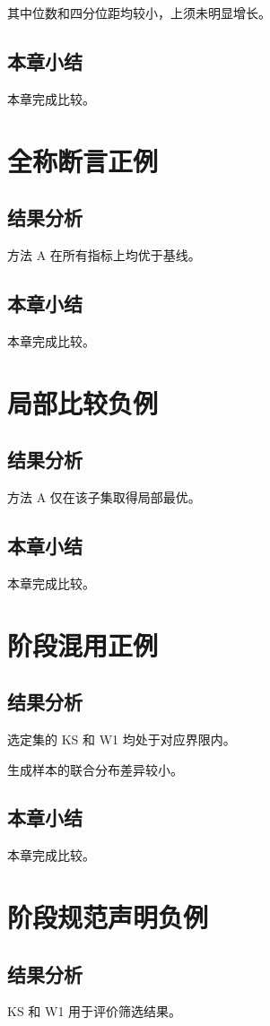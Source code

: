 其中位数和四分位距均较小，上须未明显增长。
\section{本章小结}
本章完成比较。

\chapter{全称断言正例}
\section{结果分析}
方法 A 在所有指标上均优于基线。
\section{本章小结}
本章完成比较。

\chapter{局部比较负例}
\section{结果分析}
方法 A 仅在该子集取得局部最优。
\section{本章小结}
本章完成比较。

\chapter{阶段混用正例}
\section{结果分析}
选定集的 KS 和 W1 均处于对应界限内。

生成样本的联合分布差异较小。
\section{本章小结}
本章完成比较。

\chapter{阶段规范声明负例}
\section{结果分析}
KS 和 W1 用于评价筛选结果。

